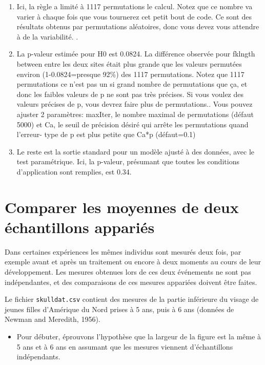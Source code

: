 \documentclass[12pt,]{book}
\providecommand{\tightlist}{%
  \setlength{\itemsep}{0pt}\setlength{\parskip}{0pt}}
\begin{document}
\begin{enumerate}
\def\labelenumi{\arabic{enumi}.}
\tightlist
\item
  Ici, la règle a limité à 1117 permutations le calcul. Notez que ce nombre va varier à chaque fois que vous tournerez cet petit bout de code. Ce sont des résultats obtenus par permutations aléatoires, donc vous devez vous attendre à de la variabilité. .
\item
  La p-valeur estimée pour H0 est 0.0824. La différence observée pour fklngth between entre les deux sites était plus grande que les valeurs permutées environ (1-0.0824=presque 92\%) des 1117 permutations. Notez que 1117 permutations ce n'est pas un si grand nombre de permutations que ça, et donc les faibles valeurs de p ne sont pas très précises. Si vous voulez des valeurs précises de p, vous devrez faire plus de permutations.. Vous pouvez ajuster 2 paramètres: maxIter, le nombre maximal de permutations (défaut 5000) et Ca, le seuil de précision désiré qui arrête les permutations quand l'erreur- type de p est plus petite que Ca*p (défaut=0.1)
\item
  Le reste est la sortie standard pour un modèle ajusté à des
  données, avec le test paramétrique. Ici, la p-valeur, présumant que toutes les conditions d'application sont remplies, est 0.34.
\end{enumerate}

\hypertarget{comparer-les-moyennes-de-deux-uxe9chantillons-appariuxe9s}{%
\section{Comparer les moyennes de deux échantillons appariés}\label{comparer-les-moyennes-de-deux-uxe9chantillons-appariuxe9s}}

Dans certaines expériences les mêmes individus sont mesurés deux fois, par exemple avant et après un traitement ou encore à deux moments au cours de leur développement. Les mesures obtenues lors de ces deux événements ne sont pas indépendantes, et des comparaisons de ces mesures appariées doivent être faites.

Le fichier \texttt{skulldat.csv} contient des mesures de la partie inférieure du visage de jeunes filles d'Amérique du Nord prises à 5 ans, puis à 6 ans (données de Newman and Meredith, 1956).

\begin{itemize}
\tightlist
\item
  Pour débuter, éprouvons l'hypothèse que la largeur de la figure est la même à 5 ans et à 6 ans en assumant que les mesures viennent d'échantillons indépendants.
\end{itemize}
\end{document}
